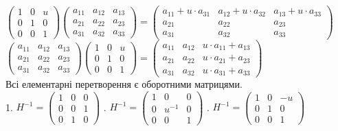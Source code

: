 \documentclass[a4paper, 10pt]{article}
\theoremstyle{theoremdd}
\theoremstyle{theoremdd}
\theoremstyle{theoremdd}
\theoremstyle{theoremdd}
\theoremstyle{theoremdd}
\theoremstyle{theoremdd}
\theoremstyle{theoremdd}
\theoremstyle{theoremdd}
\theoremstyle{theoremdd}
\theoremstyle{theoremdd}
\theoremstyle{theoremdd}
\theoremstyle{theoremdd}
\theoremstyle{theoremdd}
\theoremstyle{theoremdd}
\theoremstyle{theoremdd}
\begin{document}
$\begin{pmatrix}
1 & 0 & u \\
0 & 1 & 0 \\
0 & 0 & 1
\end{pmatrix} \begin{pmatrix}
a_{11} & a_{12} & a_{13} \\
a_{21} & a_{22} & a_{23} \\
a_{31} & a_{32} & a_{33} 
\end{pmatrix} = \begin{pmatrix}
a_{11} + u \cdot a_{31} & a_{12} + u \cdot a_{32} & a_{13} + u \cdot a_{33} \\
a_{21} & a_{22} & a_{23} \\
a_{31} & a_{32} & a_{33} 
\end{pmatrix}$\\
$\begin{pmatrix}
a_{11} & a_{12} & a_{13} \\
a_{21} & a_{22} & a_{23} \\
a_{31} & a_{32} & a_{33} 
\end{pmatrix} \begin{pmatrix}
1 & 0 & u \\
0 & 1 & 0 \\
0 & 0 & 1
\end{pmatrix} = \begin{pmatrix}
a_{11} & a_{12} & u \cdot a_{11} + a_{13} \\
a_{21} & a_{22} & u \cdot a_{21} + a_{23} \\
a_{31} & a_{32} & u \cdot a_{31} + a_{33}
\end{pmatrix}$
\bigskip \\
Всі елементарні перетворення є оборотними матрицями.\\
1. $H^{-1} = \begin{pmatrix}
1 & 0 & 0 \\
0 & 0 & 1 \\
0 & 1 & 0
\end{pmatrix}$ . $H^{-1} = \begin{pmatrix}
1 & 0 & 0 \\
0 & u^{-1} & 0 \\
0 & 0 & 1
\end{pmatrix}$ . $H^{-1} = \begin{pmatrix}
1 & 0 & -u \\
0 & 1 & 0 \\
0 & 0 & 1
\end{pmatrix}$
\end{document}
